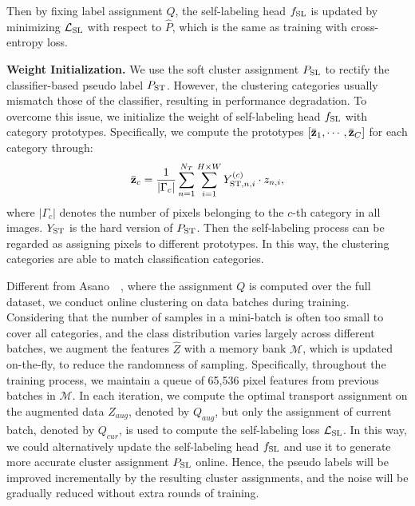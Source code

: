 \documentclass[10pt,twocolumn,letterpaper]{article}
\begin{document}
	Then by fixing label assignment $Q$, the self-labeling head $f_{\rm SL}$ is updated by minimizing $\mathcal{L}_{\rm SL}$ with respect to $\hat{P}$, which is the same as training with cross-entropy loss.
	
	\vspace{0.5em}\noindent\textbf{Weight Initialization.} We use the soft cluster assignment $P_{\rm SL}$ to rectify the classifier-based pseudo label $P_{\rm ST}$. However, the clustering categories usually mismatch those of the classifier, resulting in performance degradation. To overcome this issue, we initialize the weight of self-labeling head $f_{\rm SL}$ with category prototypes. Specifically, we compute the prototypes $[\bar{\bf{z}}_1,\cdots,\bar{\bf{z}}_C]$ for each category through:
	\begin{equation}
		\bar{\mathbf{z}}_c=\frac{1}{|\Gamma_c|}\sum_{n=1}^{N_T}\sum_{i=1}^{H\times W}Y_{{\rm ST},n,i}^{(c)}\cdot z_{n,i},
	\end{equation}
	where $|\Gamma_c|$ denotes the number of pixels belonging to the $c$-th category in all images. $Y_{{\rm ST}}$ is the hard version of $P_{{\rm ST}}$. Then the self-labeling process can be regarded as assigning pixels to different prototypes. In this way, the clustering categories are able to match classification categories.
	
	\vspace{0.5em} Different from Asano~\etal~\cite{asano2020self}, where the assignment $Q$ is computed over the full dataset, we conduct online clustering on data batches during training. Considering that the number of samples in a mini-batch is often too small to cover all categories, and the class distribution varies largely across different batches, we augment the features $\hat{Z}$ with a memory bank $\mathcal{M}$, which is updated on-the-fly, to reduce the randomness of sampling. Specifically, throughout the training process, we maintain a queue of 65,536 pixel features from previous batches in $\mathcal{M}$. In each iteration, we compute the optimal transport assignment on the augmented data $Z_{aug}$, denoted by $Q_{aug}$, but only the assignment of current batch, denoted by $Q_{cur}$, is used to compute the self-labeling loss $\mathcal{L}_{\rm SL}$. In this way, we could alternatively update the self-labeling head $f_{\rm SL}$ and use it to generate more accurate cluster assignment $P_{\rm SL}$ online. Hence, the pseudo labels will be improved incrementally by the resulting cluster assignments, and the noise will be gradually reduced without extra rounds of training. 
	
\end{document}
